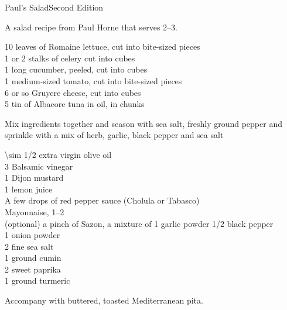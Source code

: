 
\begin{entry}{Paul's Salad}{Second Edition}

\begin{open}
    A salad recipe from Paul Horne that serves \numrange{2}{3}.
\end{open}
\begin{ingredients}
    10 leaves of Romaine lettuce, cut into bite-sized pieces\\
    1 or 2 stalks of celery cut into cubes\\
    1 long cucumber, peeled, cut into cubes\\
    1 medium-sized tomato, cut into bite-sized pieces\\
    \SI{6}{\ounce} or so Gruyere cheese, cut into cubes\\
    \SI{5}{\ounce} tin of Albacore tuna in oil, in chunks
\end{ingredients}
Mix ingredients together and season with sea salt, freshly ground pepper and
sprinkle with a mix of herb, garlic, black pepper and sea salt


\begin{ingredients}
    \SI{\sim 1/2}{\cup} extra virgin olive oil\\
    \SI{3}{\tblspoon} Balsamic vinegar\\
    \SI{1}{\tblspoon} Dijon mustard\\
    \SI{1}{\tblspoon} lemon juice\\
    A few drops of red pepper sauce (Cholula or Tabasco)\\
    Mayonnaise, \SIrange[range-phrase={ or }]{1}{2}{\tblspoon}\\
    (optional) a pinch of Sazon, a mixture of \SI{1}{\tblspoon} garlic powder
    \SI{1/2}{\teaspoon} black pepper\\
    \SI{1}{\tblspoon} onion powder\\
    \SI{2}{\tblspoon} fine sea salt\\
    \SI{1}{\tblspoon} ground cumin\\
    \SI{2}{\tblspoon} sweet paprika\\
    \SI{1}{\tblspoon} ground turmeric
\end{ingredients}
Accompany with buttered, toasted Mediterranean pita.
\end{entry}

